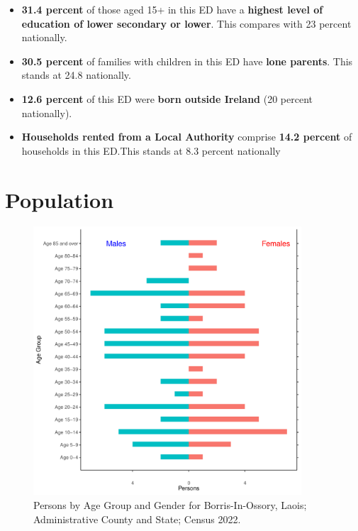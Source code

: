 \documentclass{article}
\begin{document}
\begin{itemize}
\item \textbf{31.4 percent} of those aged 15+ in this ED have a \textbf{highest level of education of lower secondary or lower}. This compares with 23 percent nationally. 

\item \textbf{30.5 percent} of families with children in this ED have \textbf{lone parents}. This stands at 24.8 nationally.

\item \textbf{12.6 percent} of this ED were \textbf{born outside Ireland} (20 percent nationally).

\item \textbf{Households rented from a Local Authority} comprise \textbf{14.2 percent} of households in this ED.This stands at 8.3 percent nationally

\end{itemize}

\pagebreak

\section{Population} 
\label{sect:Pop}

\begin{figure}[h]
	\centering
	\includegraphics[width = 100mm]{../figures/PyramidPlot.pdf}
	\caption{Persons by Age Group and Gender for Borris-In-Ossory, Laois; Administrative County and State; Census 2022.}
	\label{fig:2ae19629-1a6a-13a3-e055-000000000001}
	\end{figure}
\end{document}

